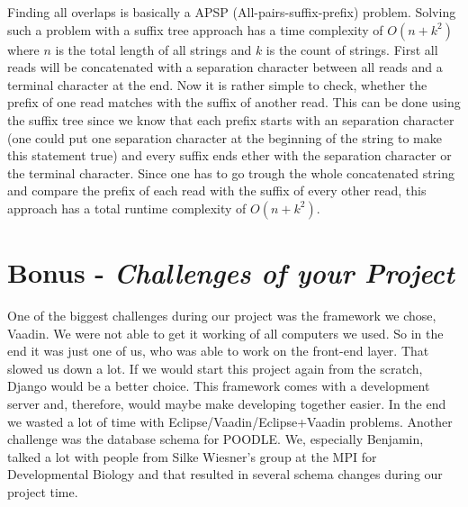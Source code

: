 \documentclass[%
   10pt,              %
   ngerman,           %
   a4paper,           %
   DIV11,             %
]{scrartcl}%
\begin{document}
Finding all overlaps is basically a APSP (All-pairs-suffix-prefix) problem. Solving such a problem 
with a suffix tree approach has a time complexity of $O(n + k^2)$ where $n$ is the total length of 
all strings and $k$ is the count of strings. First all reads will be concatenated with a separation 
character between all reads and a terminal character at the end. Now it is rather simple to check, 
whether the prefix of one read matches with the suffix of another read. This can be done using the 
suffix tree since we know that each prefix starts with an separation character (one could put one 
separation character at the beginning of the string to make this statement true) and every suffix 
ends ether with the separation character or the terminal character. Since one has to go trough the 
whole concatenated string and compare the prefix of each read with the suffix of every other read, 
this approach has a total runtime complexity of $O(n+k^2)$.

\section*{Bonus - \textit{Challenges of your Project}}

One of the biggest challenges during our project was the framework we chose, Vaadin. We were not able 
to get it working of all computers we used. So in the end it was just one of us, who was able to work 
on the front-end layer. That slowed us down a lot. If we would start this project again from the scratch, 
Django would be a better choice. This framework comes with a development server and, therefore, would 
maybe make developing together easier. In the end we wasted a lot of time with Eclipse/Vaadin/Eclipse+Vaadin 
problems. Another challenge was the database schema for POODLE. We, especially Benjamin, talked a lot 
with people from Silke Wiesner's group at the MPI for Developmental Biology and that resulted in 
several schema changes during our project time.
\end{document}
